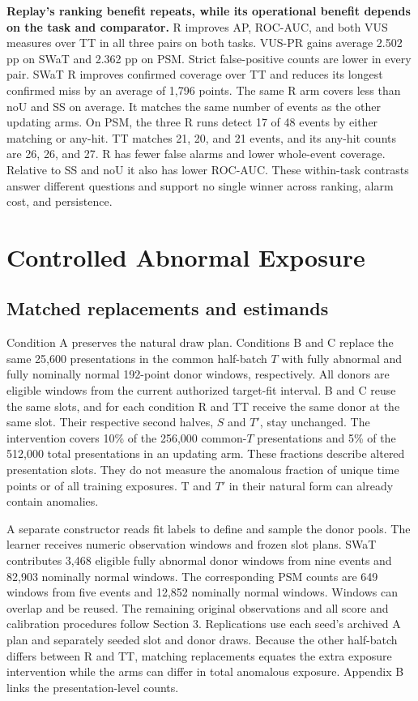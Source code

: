 \documentclass[
  american,
]{article}
\begin{document}
\textbf{Replay's ranking benefit repeats, while its operational benefit
depends on the task and comparator.} R improves AP, ROC-AUC, and both
VUS measures over TT in all three pairs on both tasks. VUS-PR gains
average 2.502 pp on SWaT and 2.362 pp on PSM. Strict false-positive
counts are lower in every pair. SWaT R improves confirmed coverage over
TT and reduces its longest confirmed miss by an average of 1,796 points.
The same R arm covers less than noU and SS on average. It matches the
same number of events as the other updating arms. On PSM, the three R
runs detect 17 of 48 events by either matching or any-hit. TT matches
21, 20, and 21 events, and its any-hit counts are 26, 26, and 27. R has
fewer false alarms and lower whole-event coverage. Relative to SS and
noU it also has lower ROC-AUC. These within-task contrasts answer
different questions and support no single winner across ranking, alarm
cost, and persistence.

\section{Controlled Abnormal
Exposure}\label{controlled-abnormal-exposure}

\subsection{Matched replacements and
estimands}\label{matched-replacements-and-estimands}

Condition A preserves the natural draw plan. Conditions B and C replace
the same 25,600 presentations in the common half-batch \(T\) with fully
abnormal and fully nominally normal 192-point donor windows,
respectively. All donors are eligible windows from the current
authorized target-fit interval. B and C reuse the same slots, and for
each condition R and TT receive the same donor at the same slot. Their
respective second halves, \(S\) and \(T'\), stay unchanged. The
intervention covers 10\% of the 256,000 common-\(T\) presentations and
5\% of the 512,000 total presentations in an updating arm. These
fractions describe altered presentation slots. They do not measure the
anomalous fraction of unique time points or of all training exposures. T
and \(T'\) in their natural form can already contain anomalies.

A separate constructor reads fit labels to define and sample the donor
pools. The learner receives numeric observation windows and frozen slot
plans. SWaT contributes 3,468 eligible fully abnormal donor windows from
nine events and 82,903 nominally normal windows. The corresponding PSM
counts are 649 windows from five events and 12,852 nominally normal
windows. Windows can overlap and be reused. The remaining original
observations and all score and calibration procedures follow Section 3.
Replications use each seed's archived A plan and separately seeded slot
and donor draws. Because the other half-batch differs between R and TT,
matching replacements equates the extra exposure intervention while the
arms can differ in total anomalous exposure. Appendix B links the
presentation-level counts.
\end{document}
